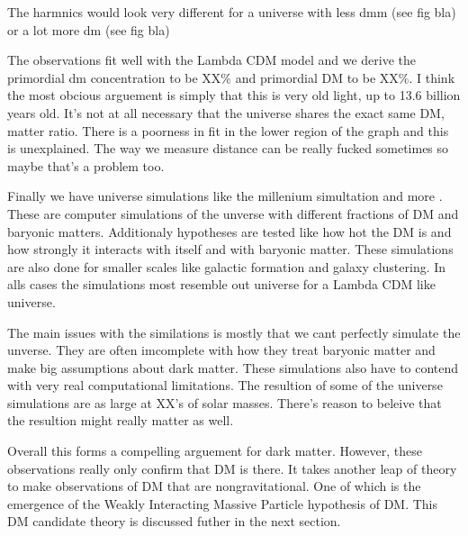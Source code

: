 
The harmnics would look very different for a universe with less dmm (see fig bla) or a lot more dm (see fig bla)


The observations fit well with the Lambda CDM model and we derive the primordial dm concentration to be XX\% and primordial DM to be XX\%.
 I think the most obcious arguement is simply that this is very old light, up to 13.6 billion years old.
It's not at all necessary that the universe shares the exact same DM, matter ratio.
There is a poorness in fit in the lower region of the graph and this is unexplained.
The way we measure distance can be really fucked sometimes so maybe that's a problem too.

Finally we have universe simulations like the millenium simultation and more \fu \ns.
These are computer simulations of the unverse with different fractions of DM and baryonic matters.
Additionaly hypotheses are tested like how hot the DM is and how strongly it interacts with itself and with baryonic matter.
These simulations are also done for smaller scales like galactic formation and galaxy clustering.
In alls cases the simulations most resemble out universe for a Lambda CDM like universe.

The main issues with the similations is mostly that we cant perfectly simulate the unverse.
They are often imcomplete with how they treat baryonic matter and make big assumptions about dark matter.
These simulations also have to contend with very real computational limitations.
The resultion of some of the universe simulations are as large at XX's of solar masses.
There's reason to beleive that the resultion might really matter as well. \ns \fu


Overall this forms a compelling arguement for dark matter.
However, these observations really only confirm that DM is there.
It takes another leap of theory to make observations of DM that are nongravitational.
One of which is the emergence of the Weakly Interacting Massive Particle hypothesis of DM.
This DM candidate theory is discussed futher in the next section.


